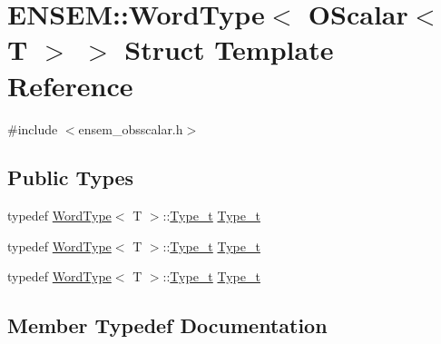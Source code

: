 \hypertarget{structENSEM_1_1WordType_3_01OScalar_3_01T_01_4_01_4}{}\section{E\+N\+S\+EM\+:\+:Word\+Type$<$ O\+Scalar$<$ T $>$ $>$ Struct Template Reference}
\label{structENSEM_1_1WordType_3_01OScalar_3_01T_01_4_01_4}


{\ttfamily \#include $<$ensem\+\_\+obsscalar.\+h$>$}

\subsection*{Public Types}
\begin{DoxyCompactItemize}
\item 
typedef \mbox{\hyperlink{structENSEM_1_1WordType}{Word\+Type}}$<$ T $>$\+::\mbox{\hyperlink{structENSEM_1_1WordType_3_01OScalar_3_01T_01_4_01_4_a8fa9533e78185900519355e6b5dc8ab5}{Type\+\_\+t}} \mbox{\hyperlink{structENSEM_1_1WordType_3_01OScalar_3_01T_01_4_01_4_a8fa9533e78185900519355e6b5dc8ab5}{Type\+\_\+t}}
\item 
typedef \mbox{\hyperlink{structENSEM_1_1WordType}{Word\+Type}}$<$ T $>$\+::\mbox{\hyperlink{structENSEM_1_1WordType_3_01OScalar_3_01T_01_4_01_4_a8fa9533e78185900519355e6b5dc8ab5}{Type\+\_\+t}} \mbox{\hyperlink{structENSEM_1_1WordType_3_01OScalar_3_01T_01_4_01_4_a8fa9533e78185900519355e6b5dc8ab5}{Type\+\_\+t}}
\item 
typedef \mbox{\hyperlink{structENSEM_1_1WordType}{Word\+Type}}$<$ T $>$\+::\mbox{\hyperlink{structENSEM_1_1WordType_3_01OScalar_3_01T_01_4_01_4_a8fa9533e78185900519355e6b5dc8ab5}{Type\+\_\+t}} \mbox{\hyperlink{structENSEM_1_1WordType_3_01OScalar_3_01T_01_4_01_4_a8fa9533e78185900519355e6b5dc8ab5}{Type\+\_\+t}}
\end{DoxyCompactItemize}


\subsection{Member Typedef Documentation}
\mbox{\label{structENSEM_1_1WordType_3_01OScalar_3_01T_01_4_01_4_a8fa9533e78185900519355e6b5dc8ab5}} 
